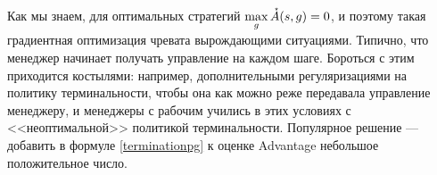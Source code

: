 Как мы знаем, для оптимальных стратегий $\max\limits_{g} \accentset{\star}{A}(s, g) = 0$, и поэтому такая градиентная оптимизация чревата вырождающими ситуациями. Типично, что менеджер начинает получать управление на каждом шаге. Бороться с этим приходится костылями: например, дополнительными регуляризациями на политику терминальности, чтобы она как можно реже передавала управление менеджеру, и менеджеры с рабочим учились в этих условиях с <<неоптимальной>> политикой терминальности. Популярное решение --- добавить в формуле \eqref{terminationpg} к оценке Advantage небольшое положительное число.




